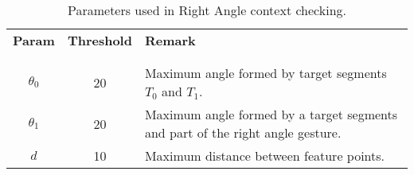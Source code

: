 \begin{table}
\centering
\begin{tabular}{c c p{8cm}}
\textbf{Param} & \textbf{Threshold} & \textbf{Remark} \\
\\
\hline
\\
$\theta_0$ &

20 & 

Maximum angle formed by target segments $T_0$ and $T_1$.

\\
$\theta_1$ &

20 & 

Maximum angle formed by a target segments and part of the right angle gesture.

\\

$d$ &

10 & 

Maximum distance between feature points.

\\


\end{tabular}
\caption[Right Angle Gesture Parameters]{Parameters used in Right Angle context checking.}
\label{tab:right-angle-params}
\end{table}
